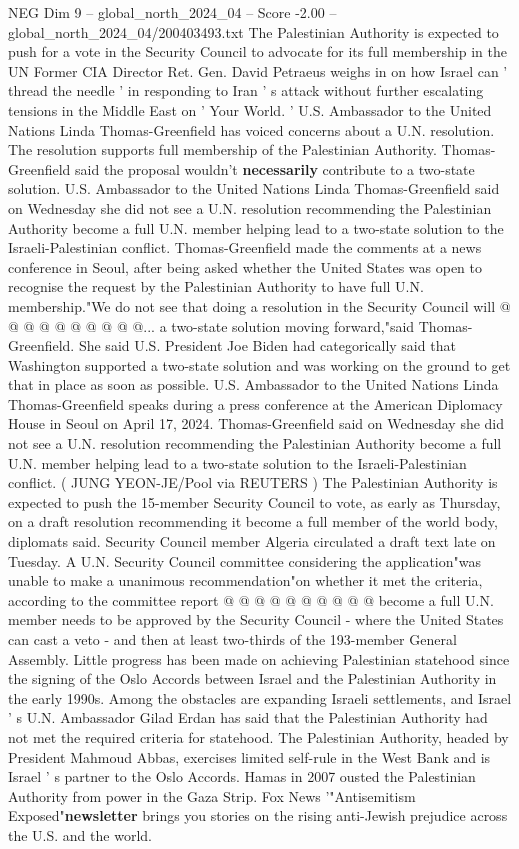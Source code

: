 \begin{textsample}{NEG Dim 9 – global\_north\_2024\_04 – Score -2.00 – global\_north\_2024\_04/200403493.txt}  \label{ex:f9_neg_221}
The Palestinian Authority is expected to push for a vote in the Security Council to advocate for its full membership in the UN Former CIA Director Ret.
Gen.
David Petraeus weighs in on how Israel can ' thread the needle ' in responding to Iran ' s attack without further escalating tensions in the Middle East on ' Your World. ' U.S.
Ambassador to the United Nations Linda Thomas-Greenfield has voiced concerns about a U.N. resolution.
The resolution supports full membership of the Palestinian Authority.
Thomas-Greenfield said the proposal wouldn't \textbf{necessarily} contribute to a two-state solution.
U.S.
Ambassador to the United Nations Linda Thomas-Greenfield said on Wednesday she did not see a U.N. resolution recommending the Palestinian Authority become a full U.N. member helping lead to a two-state solution to the Israeli-Palestinian conflict.
Thomas-Greenfield made the comments at a news conference in Seoul, after being asked whether the United States was open to recognise the request by the Palestinian Authority to have full U.N. membership."We do not see that doing a resolution in the Security Council will @ @ @ @ @ @ @ @ @ @... a two-state solution moving forward,"said Thomas-Greenfield.
She said U.S.
President Joe Biden had categorically said that Washington supported a two-state solution and was working on the ground to get that in place as soon as possible.
U.S.
Ambassador to the United Nations Linda Thomas-Greenfield speaks during a press conference at the American Diplomacy House in Seoul on April 17, 2024.
Thomas-Greenfield said on Wednesday she did not see a U.N. resolution recommending the Palestinian Authority become a full U.N. member helping lead to a two-state solution to the Israeli-Palestinian conflict. ( JUNG YEON-JE/Pool via REUTERS ) The Palestinian Authority is expected to push the 15-member Security Council to vote, as early as Thursday, on a draft resolution recommending it become a full member of the world body, diplomats said.
Security Council member Algeria circulated a draft text late on Tuesday.
A U.N.
Security Council committee considering the application"was unable to make a unanimous recommendation"on whether it met the criteria, according to the committee report @ @ @ @ @ @ @ @ @ @ become a full U.N. member needs to be approved by the Security Council - where the United States can cast a veto - and then at least two-thirds of the 193-member General Assembly.
Little progress has been made on achieving Palestinian statehood since the signing of the Oslo Accords between Israel and the Palestinian Authority in the early 1990s.
Among the obstacles are expanding Israeli settlements, and Israel ' s U.N.
Ambassador Gilad Erdan has said that the Palestinian Authority had not met the required criteria for statehood.
The Palestinian Authority, headed by President Mahmoud Abbas, exercises limited self-rule in the West Bank and is Israel ' s partner to the Oslo Accords.
Hamas in 2007 ousted the Palestinian Authority from power in the Gaza Strip.
Fox News '"Antisemitism Exposed"\textbf{newsletter} brings you stories on the rising anti-Jewish prejudice across the U.S. and the world.

\end{textsample}
